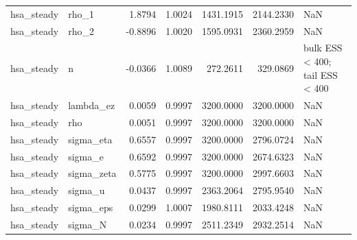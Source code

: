 \begin{tabular}{llrrrrl}
hsa\_steady & rho\_1 & 1.8794 & 1.0024 & 1431.1915 & 2144.2330 & NaN \\
hsa\_steady & rho\_2 & -0.8896 & 1.0020 & 1595.0931 & 2360.2959 & NaN \\
hsa\_steady & n & -0.0366 & 1.0089 & 272.2611 & 329.0869 & bulk ESS < 400; tail ESS < 400 \\
hsa\_steady & lambda\_ez & 0.0059 & 0.9997 & 3200.0000 & 3200.0000 & NaN \\
hsa\_steady & rho & 0.0051 & 0.9997 & 3200.0000 & 3200.0000 & NaN \\
hsa\_steady & sigma\_eta & 0.6557 & 0.9997 & 3200.0000 & 2796.0724 & NaN \\
hsa\_steady & sigma\_e & 0.6592 & 0.9997 & 3200.0000 & 2674.6323 & NaN \\
hsa\_steady & sigma\_zeta & 0.5775 & 0.9997 & 3200.0000 & 2997.6603 & NaN \\
hsa\_steady & sigma\_u & 0.0437 & 0.9997 & 2363.2064 & 2795.9540 & NaN \\
hsa\_steady & sigma\_eps & 0.0299 & 1.0007 & 1980.8111 & 2033.4248 & NaN \\
hsa\_steady & sigma\_N & 0.0234 & 0.9997 & 2511.2349 & 2932.2514 & NaN \\
\bottomrule
\end{tabular}
